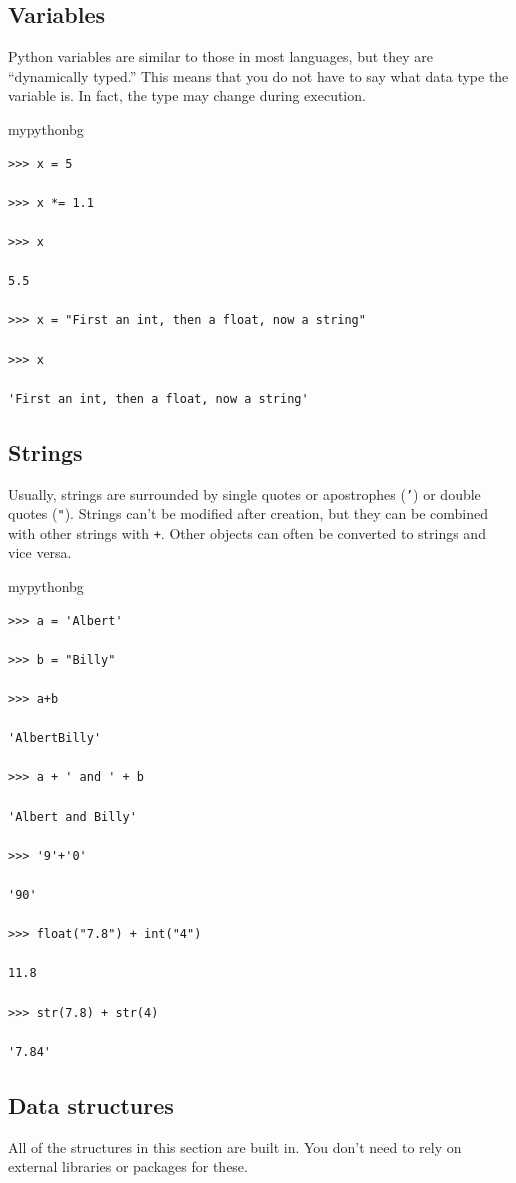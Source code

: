 \subsection{Variables}
Python variables are similar to those in most languages,
but they are ``dynamically typed.''
This means that you do not have to say what data type the variable is.
In fact, the type may change during execution.
\begin{tsession}{mypythonbg}
\begin{verbatim}
>>> x = 5

>>> x *= 1.1

>>> x

5.5

>>> x = "First an int, then a float, now a string"

>>> x

'First an int, then a float, now a string'
\end{verbatim}
\end{tsession}

\subsection{Strings}
Usually, strings are surrounded by single quotes or apostrophes (\texttt{'}) or double quotes (\texttt{"}).
Strings can't be modified after creation,
but they can be combined with other strings with \texttt{+}.
Other objects can often be converted to strings and vice versa.
\begin{tsession}{mypythonbg}
\begin{verbatim}
>>> a = 'Albert'

>>> b = "Billy"

>>> a+b

'AlbertBilly'

>>> a + ' and ' + b

'Albert and Billy'

>>> '9'+'0'

'90'

>>> float("7.8") + int("4")

11.8

>>> str(7.8) + str(4)

'7.84'
\end{verbatim}
\end{tsession}

\subsection{Data structures}
All of the structures in this section are built in.
You don't need to rely on external libraries or packages for these.

